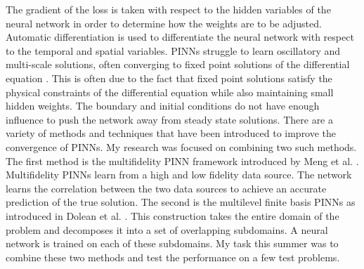 \documentclass[12pt]{article}
\begin{document}
The gradient of the loss is taken with respect to the hidden variables of the neural network in order to determine how the weights are to be adjusted. Automatic differentiation is used to differentiate the neural network with respect to the temporal and spatial variables. PINNs struggle to learn oscillatory and multi-scale solutions, often converging to fixed point solutions of the differential equation \cite{fixedpts}. This is often due to the fact that fixed point solutions satisfy the physical constraints of the differential equation while also maintaining small hidden weights. The boundary and initial conditions do not have enough influence to push the network away from steady state solutions. There are a variety of methods and techniques that have been introduced to improve the convergence of PINNs. My research was focused on combining two such methods. The first method is the multifidelity PINN framework introduced by Meng et al. \cite{mfpinns}. Multifidelity PINNs learn from a high and low fidelity data source. The network learns the correlation between the two data sources to achieve an accurate prediction of the true solution. The second is the multilevel finite basis PINNs as introduced in Dolean et al. \cite{fbpinns}. This construction takes the entire domain of the problem and decomposes it into a set of overlapping subdomains. A neural network is trained on each of these subdomains. My task this summer was to combine these two methods and test the performance on a few test problems.


\end{document}
